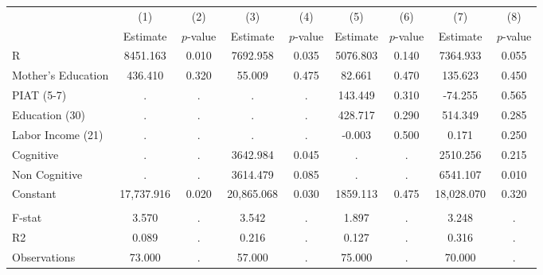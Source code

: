 \begin{tabular}{lcccccccc} \toprule
 & (1) & (2) & (3) & (4) & (5) & (6) & (7) & (8) \\ 
 & Estimate  & $p$-value  & Estimate  & $p$-value  & Estimate  & $p$-value  & Estimate  & $p$-value  \\  \midrule
R &  8451.163 &     0.010 &  7692.958 &     0.035 &  5076.803 &     0.140 &  7364.933 &     0.055 \\  
Mother's Education &   436.410 &     0.320 &    55.009 &     0.475 &    82.661 &     0.470 &   135.623 &     0.450 \\  
PIAT (5-7) &         . &         . &         . &         . &   143.449 &     0.310 &   -74.255 &     0.565 \\  
Education (30) &         . &         . &         . &         . &   428.717 &     0.290 &   514.349 &     0.285 \\  
Labor Income (21) &         . &         . &         . &         . &    -0.003 &     0.500 &     0.171 &     0.250 \\  
Cognitive &         . &         . &  3642.984 &     0.045 &         . &         . &  2510.256 &     0.215 \\  
Non Cognitive &         . &         . &  3614.479 &     0.085 &         . &         . &  6541.107 &     0.010 \\  
Constant & 17,737.916 &     0.020 & 20,865.068 &     0.030 &  1859.113 &     0.475 & 18,028.070 &     0.320 \\  \\ \midrule
F-stat &     3.570 &         . &     3.542 &         . &     1.897 &         . &     3.248 &         . \\  
R2 &     0.089 &         . &     0.216 &         . &     0.127 &         . &     0.316 &         . \\  
Observations &    73.000 &         . &    57.000 &         . &    75.000 &         . &    70.000 &         . \\  
\bottomrule \end{tabular}
